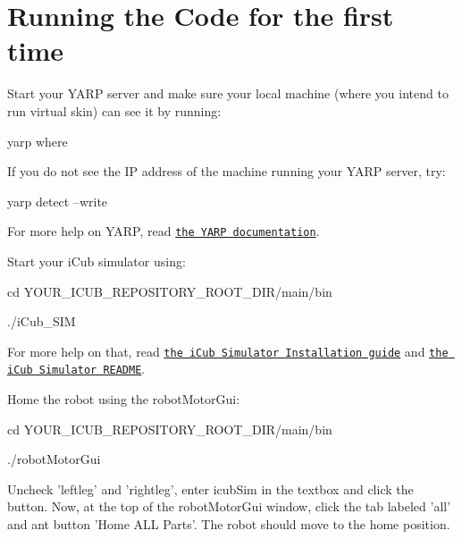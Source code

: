 \hypertarget{_robot_run}{}\section{Running the Code for the first time}\label{_robot_run}
Start your YARP server and make sure your local machine (where you intend to run virtual skin) can see it by running: \begin{DoxyVerb}yarp where \end{DoxyVerb}
 If you do not see the IP address of the machine running your YARP server, try: \begin{DoxyVerb}yarp detect --write \end{DoxyVerb}
 For more help on YARP, read \href{http://eris.liralab.it/yarpdoc/index.html}{\tt the YARP documentation}.

Start your iCub simulator using: \begin{DoxyVerb}cd YOUR_ICUB_REPOSITORY_ROOT_DIR/main/bin \end{DoxyVerb}
 \begin{DoxyVerb}./iCub_SIM \end{DoxyVerb}
 For more help on that, read \href{http://eris.liralab.it/wiki/ODE}{\tt the iCub Simulator Installation guide} and \href{http://eris.liralab.it/wiki/Simulator_README}{\tt the iCub Simulator README}.

Home the robot using the robotMotorGui: \begin{DoxyVerb}\verbatim cd YOUR_ICUB_REPOSITORY_ROOT_DIR/main/bin \end{DoxyVerb}
 \begin{DoxyVerb}./robotMotorGui \end{DoxyVerb}
 Uncheck 'leftleg' and 'rightleg', enter {\ttfamily icubSim} in the textbox and click the button. Now, at the top of the robotMotorGui window, click the tab labeled 'all' and ant button 'Home ALL Parts'. The robot should move to the home position.


